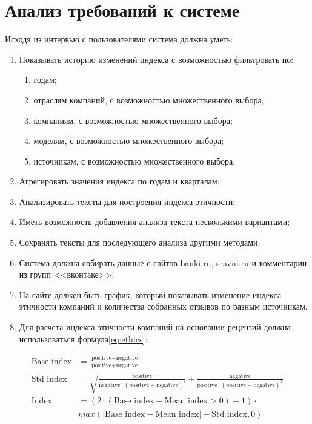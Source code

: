 \documentclass[PI, VKR]{HSEUniversity}
\begin{document}
\section{Анализ требований к системе}
\label{sec:org8194d92}
Исходя из интервью с пользователями система должна уметь:
\begin{enumerate}
\item Показывать историю изменений индекса с возможностью фильтровать по:
\begin{enumerate}
\item годам;
\item отраслям компаний, с возможностью множественного выбора;
\item компаниям, с возможностью множественного выбора;
\item моделям, с возможностью множественного выбора;
\item источникам, с возможностью множественного выбора.
\end{enumerate}
\item Агрегировать значения индекса по годам и кварталам;
\item Анализировать тексты для построения индекса этичности;
\item Иметь возможность добавления анализа текста несколькими вариантами;
\item Сохранять тексты для последующего анализа другими методами;
\item Система должна собирать данные с сайтов banki.ru, sravni.ru и комментарии из групп {}<<вконтаке>>{};
\item На сайте должен быть график, который показывать изменение индекса этичности компаний и количества собранных отзывов по разным источникам.
\item Для расчета индекса этичности компаний на основании рецензий должна использоваться формула\ref{eq:ethics}:
\end{enumerate}

\begin{equation}
\label{eq:ethics}
\begin{aligned}
\text{Base index} &= \frac{\text{positive} - \text{negative}}{\text{positive} + \text{negative}} \\
\text{Std index} &= \sqrt{\frac{\text{positive}}{\text{negative} \cdot (\text{positive} + \text{negative})^{3}} + \frac{\text{negative}}{\text{positive} \cdot (\text{positive} + \text{negative})^{3}}} \\
\text{Index} &= ({2\cdot({\text{Base index}}-{\text{Mean index}} > 0) - 1})\cdot\\
            &{max\left(\left|{\text{Base index}}-{\text{Mean index}}\right|-{\text{Std index}}, 0\right)}
\end{aligned}
\end{equation}
\end{document}
